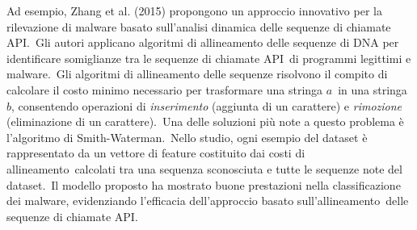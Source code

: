 Ad esempio, Zhang et al. (2015) propongono un approccio innovativo per la rilevazione di malware basato sull'analisi dinamica delle sequenze di chiamate API.\
Gli autori applicano algoritmi di allineamento delle sequenze di DNA per identificare somiglianze tra le sequenze di chiamate API\
di programmi legittimi e malware.\
Gli algoritmi di allineamento delle sequenze risolvono il compito di calcolare il costo minimo necessario per trasformare una stringa $a$\
in una stringa $b$, consentendo operazioni di \textit{inserimento} (aggiunta di un carattere) e \textit{rimozione} (eliminazione di un carattere).\
Una delle soluzioni più note a questo problema è l'algoritmo di Smith-Waterman.\
Nello studio, ogni esempio del dataset è rappresentato da un vettore di feature costituito dai costi di allineamento\
calcolati tra una sequenza sconosciuta e tutte le sequenze note del dataset.\
Il modello proposto ha mostrato buone prestazioni nella classificazione dei malware, evidenziando l'efficacia dell'approccio basato sull'allineamento\
delle sequenze di chiamate API.

